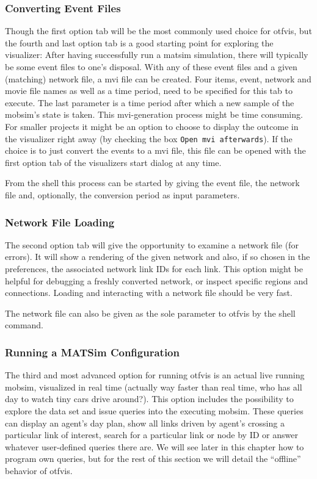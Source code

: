 \subsubsection{Converting Event Files}
Though the first option tab will be the most commonly used choice for \gls{otfvis}, but the fourth and last option tab is a good starting point for exploring the visualizer: After having successfully run a \gls{matsim} simulation, there will typically be some event files to one's disposal. With any of these event files and a given (matching) network file, a \gls{mvi} file can be created. 
Four items, \ie event, network and movie file names as well as a time period, need to be specified for this tab to execute. 
The last parameter is a time period after which a new sample of the \gls{mobsim}'s state is taken. 
This \gls{mvi}-generation process might be time consuming. For smaller projects it might be an option to choose to display the outcome in the visualizer right away (by checking the box \lstinline|Open mvi afterwards|). 
If the choice is to just convert the events to a \gls{mvi} file, this file can be opened with the first option tab of the visualizers start dialog at any time. 

From the shell this process can be started by giving the event file, the network file and, optionally, the conversion period as input parameters.

\subsubsection{Network File Loading}
The second option tab will give the opportunity to examine a network file (\eg for errors). 
It will show a rendering of the given network and also, if so chosen in the preferences, the associated network link IDs for each link. 
This option might be helpful for debugging a freshly converted network, or inspect specific regions and connections. Loading and interacting with a network file should be very fast. 

The network file can also be given as the sole parameter to \gls{otfvis} by the shell command.

\subsubsection{Running a MATSim Configuration}
The third and most advanced option for running \gls{otfvis} is an actual live running \gls{mobsim}, visualized in real time (actually way faster than real time, who has all day to watch tiny cars drive around?). This option includes the possibility to explore the data set and issue queries into the executing \gls{mobsim}. These queries can display an agent's day plan, show all links driven by agent's crossing a particular link of interest, search for a particular link or node by ID or answer whatever user-defined queries there are. We will see later in this chapter how to program own queries, but for the rest of this section we will detail the ``offline'' behavior of \gls{otfvis}. 

